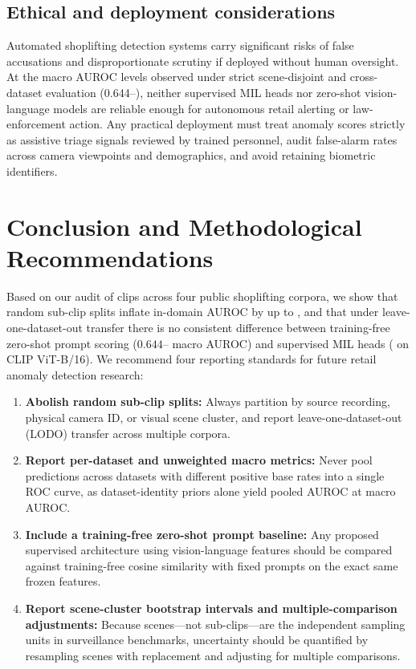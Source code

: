 \documentclass[pdflatex,sn-mathphys-num]{sn-jnl}
\begin{document}
\subsection{Ethical and deployment considerations}

Automated shoplifting detection systems carry significant risks of false accusations and disproportionate scrutiny if deployed without human oversight. At the macro AUROC levels observed under strict scene-disjoint and cross-dataset evaluation (0.644--\BestZSMacro{}), neither supervised MIL heads nor zero-shot vision-language models are reliable enough for autonomous retail alerting or law-enforcement action. Any practical deployment must treat anomaly scores strictly as assistive triage signals reviewed by trained personnel, audit false-alarm rates across camera viewpoints and demographics, and avoid retaining biometric identifiers.

\section{Conclusion and Methodological Recommendations}\label{sec:conclusion}

Based on our audit of \TotalClips{} clips across four public shoplifting corpora, we show that random sub-clip splits inflate in-domain AUROC by up to \DCSASSDrop{}, and that under leave-one-dataset-out transfer there is no consistent difference between training-free zero-shot prompt scoring ($0.644$--\BestZSMacro{} macro AUROC) and supervised MIL heads (\BestTRMacro{} on CLIP ViT-B/16). We recommend four reporting standards for future retail anomaly detection research:
\begin{enumerate}
    \item \textbf{Abolish random sub-clip splits:} Always partition by source recording, physical camera ID, or visual scene cluster, and report leave-one-dataset-out (LODO) transfer across multiple corpora.
    \item \textbf{Report per-dataset and unweighted macro metrics:} Never pool predictions across datasets with different positive base rates into a single ROC curve, as dataset-identity priors alone yield \PooledAUROCID{} pooled AUROC at \MacroAUROCID{} macro AUROC.
    \item \textbf{Include a training-free zero-shot prompt baseline:} Any proposed supervised architecture using vision-language features should be compared against training-free cosine similarity with fixed prompts on the exact same frozen features.
    \item \textbf{Report scene-cluster bootstrap intervals and multiple-comparison adjustments:} Because scenes---not sub-clips---are the independent sampling units in surveillance benchmarks, uncertainty should be quantified by resampling scenes with replacement and adjusting for multiple comparisons.
\end{enumerate}
\end{document}
